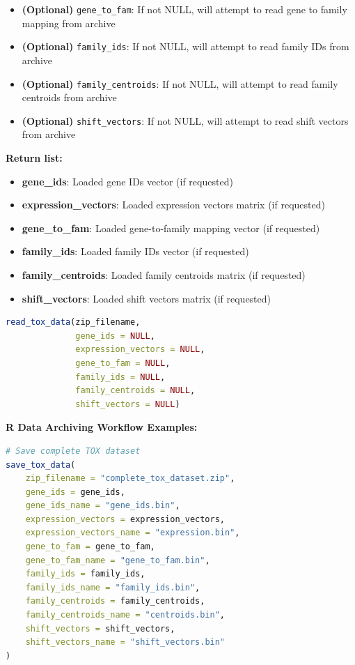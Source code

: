 \begin{enumerate}
\begin{itemize}
    \item \textbf{(Optional)} \texttt{gene\_to\_fam}: If not NULL, will attempt
          to read gene to family mapping from archive
          
    \item \textbf{(Optional)} \texttt{family\_ids}: If not NULL, will attempt
          to read family IDs from archive
          
    \item \textbf{(Optional)} \texttt{family\_centroids}: If not NULL, will attempt
          to read family centroids from archive
          
    \item \textbf{(Optional)} \texttt{shift\_vectors}: If not NULL, will attempt
          to read shift vectors from archive
\end{itemize}

\textbf{Return list:}
\begin{itemize}
    \item \textbf{gene\_ids}: Loaded gene IDs vector (if requested)
          
    \item \textbf{expression\_vectors}: Loaded expression vectors matrix (if
          requested)
          
    \item \textbf{gene\_to\_fam}: Loaded gene-to-family mapping vector (if
          requested)
          
    \item \textbf{family\_ids}: Loaded family IDs vector (if requested)
          
    \item \textbf{family\_centroids}: Loaded family centroids matrix (if
          requested)
          
    \item \textbf{shift\_vectors}: Loaded shift vectors matrix (if requested)
\end{itemize}

\begin{lstlisting}[language=R, caption={R Read TOX Data}]
read_tox_data(zip_filename,
              gene_ids = NULL,
              expression_vectors = NULL,
              gene_to_fam = NULL,
              family_ids = NULL,
              family_centroids = NULL,
              shift_vectors = NULL)
\end{lstlisting}

\textbf{R Data Archiving Workflow Examples:} 
\begin{lstlisting}[language=R, caption={R Standard TOX Data Archiving}]
# Save complete TOX dataset
save_tox_data(
    zip_filename = "complete_tox_dataset.zip",
    gene_ids = gene_ids,
    gene_ids_name = "gene_ids.bin",
    expression_vectors = expression_vectors,
    expression_vectors_name = "expression.bin",
    gene_to_fam = gene_to_fam,
    gene_to_fam_name = "gene_to_fam.bin",
    family_ids = family_ids,
    family_ids_name = "family_ids.bin",
    family_centroids = family_centroids,
    family_centroids_name = "centroids.bin",
    shift_vectors = shift_vectors,
    shift_vectors_name = "shift_vectors.bin"
)


\end{lstlisting}
\end{enumerate}
